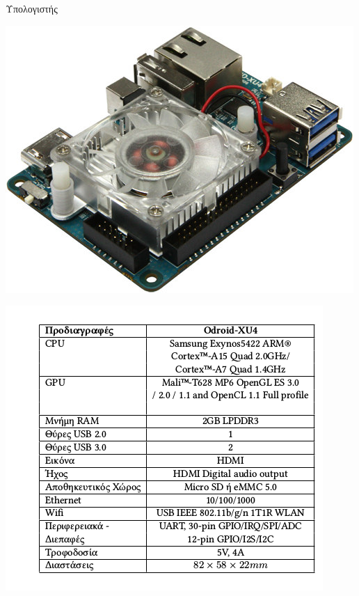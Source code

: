 \documentclass[10pt, compress]{beamer}
\begin{document}
\begin{frame}{Υπολογιστής}
	\begin{minipage}{0.49\textwidth}
		\centering
		\includegraphics[width=\linewidth]{Figures/odroid-xu4.jpg}
	\end{minipage}
	\begin{minipage}{0.49\textwidth}
		\centering
		\includegraphics[width=\linewidth]{Figures/odroid_specs.png}
	\end{minipage}
\end{frame}
\end{document}
